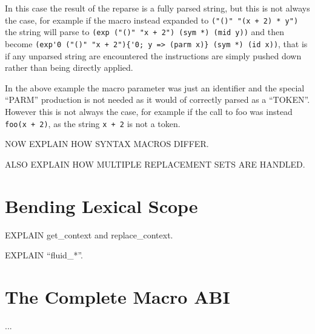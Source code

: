 \documentclass[12pt,english,letterpaper]{article}
\begin{document}
In this case the result of the reparse is a fully parsed string, but
this is not always the case, for example if the macro instead expanded
to \verb/("()" "(x + 2) * y")/ the string will parse to
\verb/(exp ("()" "x + 2") (sym *) (mid y))/ and then become
\verb/(exp'0 ("()" "x + 2"){'0; y => (parm x)} (sym *) (id x))/, that
is if any unparsed string are encountered the instructions are simply
pushed down rather than being directly applied.

In the above example the macro parameter was just an identifier and the
special ``PARM'' production is not needed as it would of correctly
parsed as a ``TOKEN''.  However this is not always the case, for
example if the call to foo was instead \verb/foo(x + 2)/, as the
string \verb/x + 2/ is not a token.

NOW EXPLAIN HOW SYNTAX MACROS DIFFER.

ALSO EXPLAIN HOW MULTIPLE REPLACEMENT SETS ARE HANDLED.

\section{Bending Lexical Scope}

EXPLAIN get\_context and replace\_context.

EXPLAIN ``fluid\_*''.

\section{The Complete Macro ABI}

...
\end{document}
